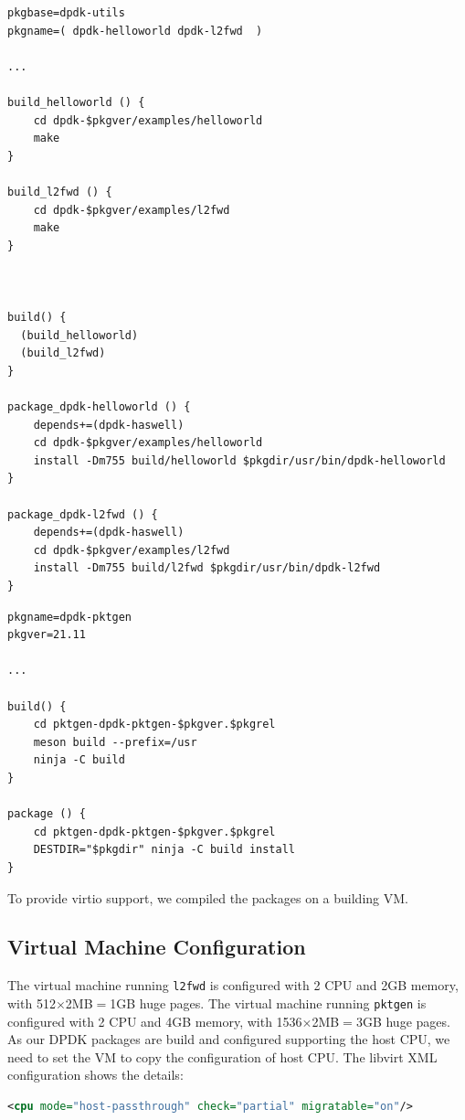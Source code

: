 \documentclass[12pt]{article}
\begin{document}
\begin{lstlisting}[caption={Build Script of \texttt{dpdk-utils}}]
pkgbase=dpdk-utils
pkgname=( dpdk-helloworld dpdk-l2fwd  )

...

build_helloworld () {
    cd dpdk-$pkgver/examples/helloworld
    make
}

build_l2fwd () {
    cd dpdk-$pkgver/examples/l2fwd
    make
}



build() {
  (build_helloworld)
  (build_l2fwd)
}

package_dpdk-helloworld () {
    depends+=(dpdk-haswell)
    cd dpdk-$pkgver/examples/helloworld
    install -Dm755 build/helloworld $pkgdir/usr/bin/dpdk-helloworld
}

package_dpdk-l2fwd () {
    depends+=(dpdk-haswell)
    cd dpdk-$pkgver/examples/l2fwd
    install -Dm755 build/l2fwd $pkgdir/usr/bin/dpdk-l2fwd
}

\end{lstlisting}

\begin{lstlisting}[caption={Build Script of \texttt{dpdk-pktgen}}]
pkgname=dpdk-pktgen
pkgver=21.11

...

build() {
    cd pktgen-dpdk-pktgen-$pkgver.$pkgrel
    meson build --prefix=/usr
    ninja -C build
}

package () {
    cd pktgen-dpdk-pktgen-$pkgver.$pkgrel
    DESTDIR="$pkgdir" ninja -C build install
}
\end{lstlisting}

To provide virtio support, we compiled the packages on a building VM.

\subsection{Virtual Machine Configuration}

The virtual machine running \texttt{l2fwd} is configured with 2 CPU and 2GB memory, with 512$\times$2MB$=$1GB huge pages. The virtual machine running \texttt{pktgen} is configured with 2 CPU and 4GB memory, with 1536$\times$2MB$=$3GB huge pages. As our DPDK packages are build and configured supporting the host CPU, we need to set the VM to copy the configuration of host CPU. The libvirt XML configuration shows the details:

\begin{lstlisting}[language=xml]
  <cpu mode="host-passthrough" check="partial" migratable="on"/>
\end{lstlisting}
\end{document}
